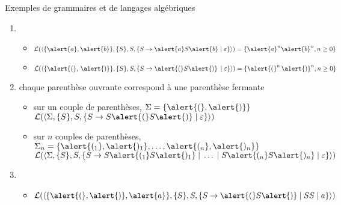 
\begingroup

\begin{frame}{Exemples de grammaires et de langages algébriques}

  \begin{enumerate}
  \item {}\vspace{2mm}
    \begin{itemize}
    \item $\mathcal{L}(\langle\{\alert{a}, \alert{b}\},\{S\},S,\{S \rightarrow \alert{a}S\alert{b} \;|\; \varepsilon\}\rangle) = \{\alert{a}^n\alert{b}^n, n\geq 0\}$\\
    \item $\mathcal{L}(\langle\{\alert{(}, \, \alert{)}\},\{S\},S,\{S \rightarrow \alert{(}S\alert{)}\, \;|\;\varepsilon \}\rangle) = \{\alert{(}^n\, \alert{)}^n, n\geq 0\}$
    \end{itemize}
    
  \item {}\vspace{2mm}

    chaque parenthèse ouvrante correspond à une parenthèse fermante
    \begin{itemize}
    \item sur un couple de parenthèses, $\Sigma = \{\alert{(}, \alert{)}\}$\\
      $\mathcal{L}(\langle \Sigma ,\{S\},S,\{S \rightarrow S\alert{(}S\alert{)} \;|\; \varepsilon \}\rangle)$
    \item sur $n$ couples de parenthèses, $\Sigma_n = \{\alert{(_1}, \alert{)_1}, \ldots, \alert{(_n}, \alert{)_n}\}$\\
      $\mathcal{L}(\langle \Sigma ,\{S\},S,\{S \rightarrow S\alert{(_1}S\alert{)_1} \;|\; \ldots \;|\;S\alert{(_n}S\alert{)_n} \;|\; \varepsilon \}\rangle)$
    \end{itemize}
    \vspace{2mm}
    
  \item {}\vspace{2mm}
    
    \begin{itemize}
    \item $\mathcal{L}(\langle \{\alert{(}, \alert{)}, \alert{a}\} ,\{S\},S,\{S \rightarrow \alert{(}S\alert{)} \;|\; SS \;|\; a\}\rangle)$
    \end{itemize}
    \vspace{2mm}
    

\end{enumerate}
\end{frame}
